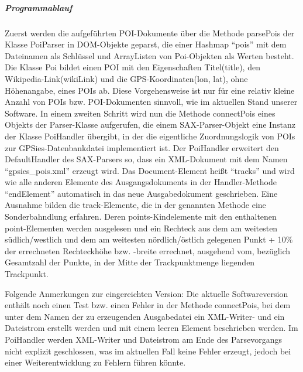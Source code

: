 \subparagraph{Programmablauf}
Zuerst werden die aufgeführten POI-Dokumente über die Methode parsePois der Klasse PoiParser in DOM-Objekte geparst, die einer Hashmap "`pois"' mit dem Dateinamen als Schlüssel und ArrayListen von Poi-Objekten als Werten besteht. Die Klasse Poi bildet einen POI mit den Eigenschaften Titel(title), den Wikipedia-Link(wikiLink) und die GPS-Koordinaten(lon, lat), ohne Höhenangabe, eines POIs ab. Diese Vorgehensweise ist nur für eine relativ kleine Anzahl von POIs bzw. POI-Dokumenten sinnvoll, wie im aktuellen Stand unserer Software.
In einem zweiten Schritt wird nun die Methode connectPois eines Objekts der Parser-Klasse aufgerufen, die einem SAX-Parser-Objekt eine Instanz der Klasse PoiHandler übergibt, in der die eigentliche Zuordnungslogik von POIs zur GPSies-Datenbankdatei implementiert ist. 
Der PoiHandler erweitert den DefaultHandler des SAX-Parsers so, dass ein XML-Dokument mit dem Namen "`gpsies\_pois.xml"' erzeugt wird. Das Document-Element heißt "`tracks"' und wird wie alle anderen Elemente des Ausgangsdokuments in der Handler-Methode "`endElement"' automatisch in das neue Ausgabedokument geschrieben. Eine Ausnahme bilden die track-Elemente, die in der genannten Methode eine Sonderbahndlung erfahren. Deren points-Kindelemente mit den enthaltenen point-Elementen werden ausgelesen und ein Rechteck aus dem am weitesten südlich/westlich und dem am weitesten nördlich/östlich gelegenen Punkt + 10\% der errechneten Rechteckhöhe bzw. -breite errechnet, ausgehend vom, bezüglich Gesamtzahl der Punkte, in der Mitte der Trackpunktmenge liegenden Trackpunkt.

Folgende Anmerkungen zur eingereichten Version: Die aktuelle Softwareversion enthält noch einen Test bzw. einen Fehler in der Methode connectPois, bei dem unter dem Namen der zu erzeugenden Ausgabedatei ein XML-Writer- und ein Dateistrom erstellt werden und mit einem leeren Element beschrieben werden. Im PoiHandler werden XML-Writer und Dateistrom am Ende des Parsevorgangs nicht explizit geschlossen, was im aktuellen Fall keine Fehler erzeugt, jedoch bei einer Weiterentwicklung zu Fehlern führen könnte.
